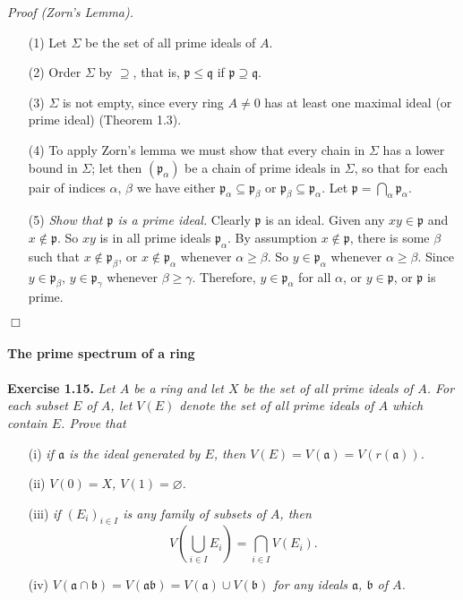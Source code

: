 \documentclass{article}
\begin{document}
\emph{Proof (Zorn's Lemma).}
\begin{enumerate}
\item[(1)]
Let $\Sigma$ be the set of all prime ideals of $A$.
\item[(2)]
Order $\Sigma$ by $\supseteq$, that is,
$\mathfrak{p} \leq \mathfrak{q}$ if $\mathfrak{p} \supseteq \mathfrak{q}$.
\item[(3)]
$\Sigma$ is not empty, since every ring $A \neq 0$
has at least one maximal ideal (or prime ideal) (Theorem 1.3).
\item[(4)]
To apply Zorn's lemma we must show that every chain in $\Sigma$ has a lower bound in $\Sigma$;
let then $(\mathfrak{p}_\alpha)$ be a chain of prime ideals in $\Sigma$,
so that for each pair of indices $\alpha$, $\beta$ we have either
$\mathfrak{p}_\alpha \subseteq \mathfrak{p}_\beta$ or
$\mathfrak{p}_\beta \subseteq \mathfrak{p}_\alpha$.
Let $\mathfrak{p} = \bigcap_{\alpha} \mathfrak{p}_\alpha$.
\item[(5)]
\emph{Show that $\mathfrak{p}$ is a prime ideal.}
Clearly $\mathfrak{p}$ is an ideal.
Given any $xy \in \mathfrak{p}$ and $x \not\in \mathfrak{p}$.
So $xy$ is in all prime ideals $\mathfrak{p}_\alpha$.
By assumption $x \not\in \mathfrak{p}$,
there is some $\beta$ such that $x \not\in \mathfrak{p}_\beta$,
or $x \not\in \mathfrak{p}_\alpha$ whenever $\alpha \geq \beta$.
So $y \in \mathfrak{p}_\alpha$ whenever $\alpha \geq \beta$.
Since $y \in \mathfrak{p}_\beta$, $y \in \mathfrak{p}_\gamma$ whenever $\beta \geq \gamma$.
Therefore, $y \in \mathfrak{p}_\alpha$ for all $\alpha$,
or $y \in \mathfrak{p}$,
or $\mathfrak{p}$ is prime.
\end{enumerate}
$\Box$ \\\\






\textbf{\large The prime spectrum of a ring} \\\\



\textbf{Exercise 1.15.}
\emph{Let $A$ be a ring and let $X$ be the set of all prime ideals of $A$.
For each subset $E$ of $A$,
let $V(E)$ denote the set of all prime ideals of $A$ which contain $E$.
Prove that}
\begin{enumerate}
\item[(i)]
\emph{if $\mathfrak{a}$ is the ideal generated by $E$,
then $V(E) = V(\mathfrak{a}) = V(r(\mathfrak{a}))$.}
\item[(ii)]
\emph{$V(0) = X$, $V(1) = \varnothing$.}
\item[(iii)]
\emph{if $(E_i)_{i \in I}$ is any family of subsets of $A$,
then
$$V\left( \bigcup_{i \in I}E_i \right) = \bigcap_{i \in I} V(E_i).$$}
\item[(iv)]
\emph{$V(\mathfrak{a} \cap \mathfrak{b})
= V(\mathfrak{a} \mathfrak{b})
= V(\mathfrak{a}) \cup V(\mathfrak{b})$
for any ideals $\mathfrak{a}$, $\mathfrak{b}$ of $A$.}
\end{enumerate}
\end{document}
